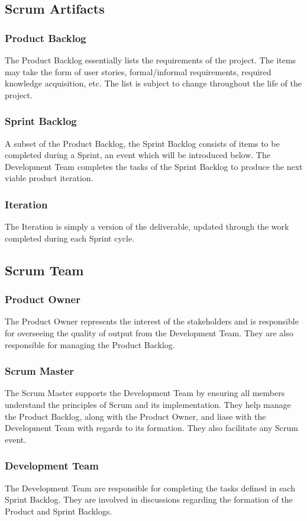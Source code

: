 \subsection{Scrum Artifacts}
\subsubsection{Product Backlog}
The Product Backlog essentially lists the requirements of the project. The items may take the form of user stories, formal/informal requirements, required knowledge acquisition, etc. The list is subject to change throughout the life of the project.
\subsubsection{Sprint Backlog}
A subset of the Product Backlog, the Sprint Backlog consists of items to be completed during a Sprint, an event which will be introduced below. The Development Team completes the tasks of the Sprint Backlog to produce the next viable product iteration.
\subsubsection{Iteration}
The Iteration is simply a version of the deliverable, updated through the work completed during each Sprint cycle.

\subsection{Scrum Team}
\subsubsection{Product Owner}
The Product Owner represents the interest of the stakeholders and is responsible for overseeing the quality of output from the Development Team. They are also responsible for managing the Product Backlog.
\subsubsection{Scrum Master}
The Scrum Master supports the Development Team by ensuring all members understand the principles of Scrum and its implementation. They help manage the Product Backlog, along with the Product Owner, and liase with the Development Team with regards to its formation. They also facilitate any Scrum event.
\subsubsection{Development Team}
The Development Team are responsible for completing the tasks defined in each Sprint Backlog. They are involved in discussions regarding the formation of the Product and Sprint Backlogs.

